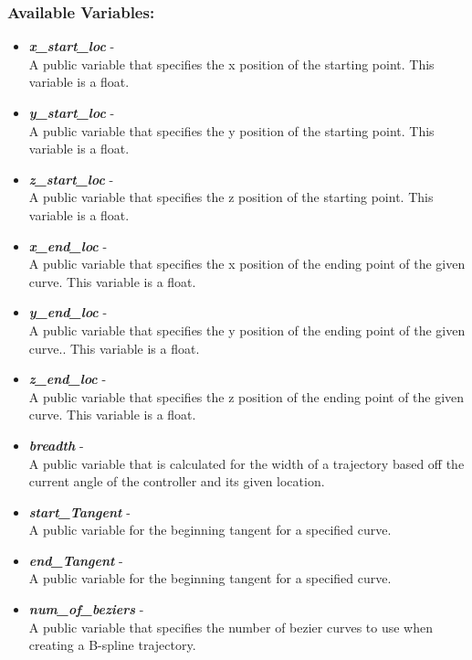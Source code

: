 \documentclass[draftclsnofoot,onecolumn,compsoc]{IEEEtran}
\begin{document}
\subsubsection{Available Variables:}
\begin{itemize}
\item \textbf{\textit{x\_start\_loc}} - \\
A public variable that specifies the x position of the starting point. This variable is a float.
\item  \textbf{\textit{y\_start\_loc}} - \\
A public variable that specifies the y position of the starting point. This variable is a float.
\item  \textbf{\textit{z\_start\_loc}} - \\
A public variable that specifies the z position of the starting point. This variable is a float.
\item  \textbf{\textit{x\_end\_loc}} - \\
A public variable that specifies the x position of the ending point of the given curve. This variable is a float.
\item  \textbf{\textit{y\_end\_loc}} - \\
A public variable that specifies the y position of the ending point of the given curve.. This variable is a float.
\item  \textbf{\textit{z\_end\_loc}} - \\
A public variable that specifies the z position of the ending point of the given curve. This variable is a float.
\item  \textbf{\textit{breadth}} - \\
A public variable that is calculated for the width of a trajectory based off the current angle of the controller and its given location.
\item  \textbf{\textit{start\_Tangent}} - \\
A public variable for the beginning tangent for a specified curve.
\item  \textbf{\textit{end\_Tangent}} - \\
A public variable for the beginning tangent for a specified curve.
\item \textbf{\textit{num\_of\_beziers}} - \\
A public variable that specifies the number of bezier curves to use when creating a B-spline trajectory.
\end{itemize}
\end{document}
